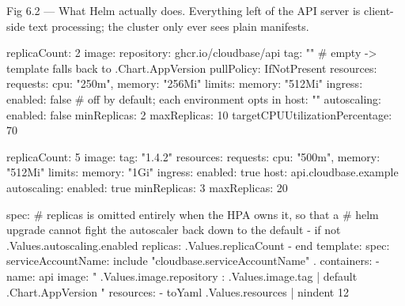 \begin{wbfigure}{Fig 6.2 — What Helm actually does. Everything left of the API server is client-side text processing; the cluster only ever sees plain manifests.}
\end{wbfigure}

\begin{yamlbox}
replicaCount: 2
image:
  repository: ghcr.io/cloudbase/api
  tag: ""            # empty -> template falls back to .Chart.AppVersion
  pullPolicy: IfNotPresent
resources:
  requests: { cpu: "250m", memory: "256Mi" }
  limits:   { memory: "512Mi" }
ingress:
  enabled: false     # off by default; each environment opts in
  host: ""
autoscaling:
  enabled: false
  minReplicas: 2
  maxReplicas: 10
  targetCPUUtilizationPercentage: 70
\end{yamlbox}

\begin{yamlbox}
replicaCount: 5
image:
  tag: "1.4.2"
resources:
  requests: { cpu: "500m", memory: "512Mi" }
  limits:   { memory: "1Gi" }
ingress:
  enabled: true
  host: api.cloudbase.example
autoscaling:
  enabled: true
  minReplicas: 3
  maxReplicas: 20
\end{yamlbox}

\begin{k8sbox}
spec:
  # replicas is omitted entirely when the HPA owns it, so that a
  # helm upgrade cannot fight the autoscaler back down to the default
  {{- if not .Values.autoscaling.enabled }}
  replicas: {{ .Values.replicaCount }}
  {{- end }}
  template:
    spec:
      serviceAccountName: {{ include "cloudbase.serviceAccountName" . }}
      containers:
        - name: api
          image: "{{ .Values.image.repository }}:{{ .Values.image.tag
                   | default .Chart.AppVersion }}"
          resources: {{- toYaml .Values.resources | nindent 12 }}
\end{k8sbox}

